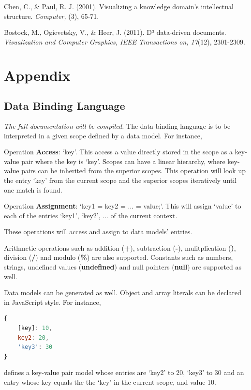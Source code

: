 \documentclass[11pt, a4paper]{report}
\begin{document}
\begin{thebibliography}{9}
Chen, C., \& Paul, R. J. (2001). Visualizing a knowledge domain's intellectual structure. \emph{Computer,} (3), 65-71.

Bostock, M., Ogievetsky, V., \& Heer, J. (2011). D³ data-driven documents. \emph{Visualization and Computer Graphics, IEEE Transactions on, 17}(12), 2301-2309.

\end{thebibliography}
\chapter{Appendix}
\section{Data Binding Language}
{\em The full documentation will be compiled. }
The data binding language is to be interpreted in a given scope defined by a data model. For instance,

Operation \textbf{Access}: `key'. This access a value directly stored in the scope as a key-value pair where the key is `key'. Scopes can have a linear hierarchy, where key-value pairs can be inherited from the superior scopes. This operation will look up the entry `key' from the current scope and the superior scopes iteratively until one match is found.

Operation \textbf{Assignment}: `key1 = key2 = ... = value;'. This will assign `value' to each of the entries `key1', `key2', ... of the current context.

These operations will access and assign to data models' entries.

Arithmetic operations such as addition ({\textbf+}), subtraction (\textbf-), mulitplication (\textbf*), division (\textbf/) and modulo (\textbf\%) are also supported. Constants such as numbers, strings, undefined values (\textbf {undefined}) and null pointers (\textbf {null}) are supported as well.

Data models can be generated as well. Object and array literals can be declared in JavaScript style. For instance,
\begin{lstlisting}[language=javascript]
{
	[key]: 10,
	key2: 20, 
	'key3': 30
}
\end{lstlisting}
defines a key-value pair model whose entries are `key2' to 20, `key3' to 30 and an entry whose key equals the the `key' in the current scope, and value 10.
\end{document}
